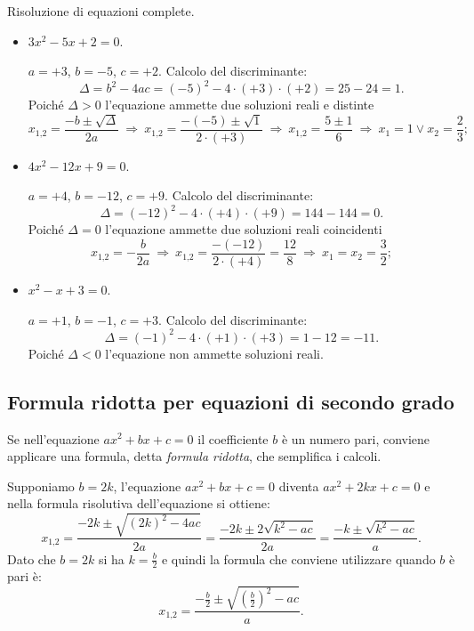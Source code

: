 \begin{exrig}
\begin{esempio}
Risoluzione di equazioni complete.
\begin{itemize}
\item $3 x^{2} - 5 x + 2=0$.

 $a = + 3$, $b = - 5$, $c = + 2$. Calcolo del discriminante: 
\[\Delta = b^{2} - 4 ac = (-5)^{2}-4\cdot(+3)\cdot(+2) = 25 - 24 = 1.\]
 Poiché $\Delta > 0$ l'equazione ammette due soluzioni reali e distinte 
\[x_{1\text{,}2} = \frac{- b \pm \sqrt{\Delta}}{2 a} \:\Rightarrow\: x_{1\text{,}2} = \frac{- (- 5) \pm \sqrt{1}}{2\cdot(+3)} \:\Rightarrow\: x_{1\text{,}2} = \frac{5 \pm 1}{6} \:\Rightarrow\: x_{1} = 1 \vee x_{2} = \frac{2}{3};\]
\item $4 x^{2} - 12 x + 9=0$.

 $a = + 4$, $b = - 12$, $c = + 9$. Calcolo del discriminante: 
\[\Delta=(-12)^{2} -4\cdot(+4)\cdot(+9)=144 - 144 =0.\] 
Poiché $\Delta = 0$ l'equazione ammette due soluzioni reali coincidenti 
\[x_{1\text{,}2} = - \frac{b}{2 a} \:\Rightarrow\: x_{1\text{,}2} = \frac{-(-12)}{2\cdot(+4)} = \frac{12}{8} \:\Rightarrow\: x_{1} = x_{2} = \frac{3}{2};\]
\item $x^{2} - x + 3=0$.

 $a = + 1$, $b = - 1$, $c = + 3$. Calcolo del discriminante: 
\[\Delta = (-1)^{2} - 4\cdot(+1)\cdot(+3) = 1 - 12 = - 11.\]
Poiché $\Delta < 0$ l'equazione non ammette soluzioni reali.
\end{itemize}
\end{esempio}
\end{exrig}
\vspazio\ovalbox{\risolvii \ref{ese:3.9}, \ref{ese:3.10}, \ref{ese:3.11}\ref{ese:3.12}, \ref{ese:3.13}}

\subsection{Formula ridotta per equazioni di secondo grado}

Se nell'equazione
$a x^{2} + b x + c=0$ il coefficiente $b$ è un numero pari, conviene applicare una formula, detta \emph{formula ridotta}, che semplifica i calcoli.

Supponiamo $b=2 k$, l'equazione $a x^{2} + b x + c=0$ diventa $a x^{2} + 2 k x + c=0$ e nella formula risolutiva dell'equazione si ottiene:
\[x_{1\text{,}2}=\frac{- 2 k \pm \sqrt{( 2 k )^{2}-4 a c}}{2 a}=\frac{- 2 k \pm 2 \sqrt{k^{2} - a c}}{2 a}=\frac{- k \pm \sqrt{k^{2} - a c}}{a}.\]
Dato che $b=2 k$ si ha $k=\frac{b}{2}$ e quindi la formula che conviene utilizzare quando $b$ è pari è:
\[x_{1\text{,}2}=\frac{-\frac{b}{2} \pm \sqrt{\left(\frac{b}{2} \right)^{2} - a c}}{a}.\]

